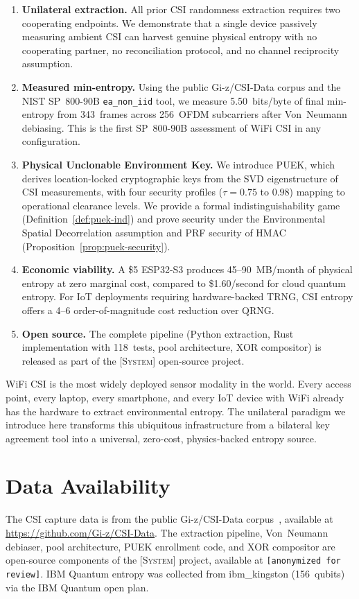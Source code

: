 \documentclass[sigconf,anonymous,review]{acmart}
\newcommand{\zipminator}{\textsc{[System]}\xspace}
\begin{document}
\begin{enumerate}
\item \textbf{Unilateral extraction.}
All prior CSI randomness extraction requires two cooperating endpoints.
We demonstrate that a single device passively measuring ambient CSI can harvest genuine physical entropy with no cooperating partner, no reconciliation protocol, and no channel reciprocity assumption.

\item \textbf{Measured min-entropy.}
Using the public Gi-z/CSI-Data corpus and the NIST SP~800-90B \texttt{ea\_non\_iid} tool, we measure 5.50~bits/byte of final min-entropy from 343~frames across 256~OFDM subcarriers after Von~Neumann debiasing.
This is the first SP~800-90B assessment of WiFi CSI in any configuration.

\item \textbf{Physical Unclonable Environment Key.}
We introduce PUEK, which derives location-locked cryptographic keys from the SVD eigenstructure of CSI measurements, with four security profiles ($\tau = 0.75$ to $0.98$) mapping to operational clearance levels.
We provide a formal indistinguishability game (Definition~\ref{def:puek-ind}) and prove security under the Environmental Spatial Decorrelation assumption and PRF security of HMAC (Proposition~\ref{prop:puek-security}).

\item \textbf{Economic viability.}
A \$5 ESP32-S3 produces 45--90~MB/month of physical entropy at zero marginal cost, compared to \$1.60/second for cloud quantum entropy.
For IoT deployments requiring hardware-backed TRNG, CSI entropy offers a 4--6 order-of-magnitude cost reduction over QRNG.

\item \textbf{Open source.}
The complete pipeline (Python extraction, Rust implementation with 118~tests, pool architecture, XOR compositor) is released as part of the \zipminator open-source project.
\end{enumerate}

WiFi CSI is the most widely deployed sensor modality in the world.
Every access point, every laptop, every smartphone, and every IoT device with WiFi already has the hardware to extract environmental entropy.
The unilateral paradigm we introduce here transforms this ubiquitous infrastructure from a bilateral key agreement tool into a universal, zero-cost, physics-backed entropy source.

\section*{Data Availability}
The CSI capture data is from the public Gi-z/CSI-Data corpus~\cite{gringoli2019csidata}, available at \url{https://github.com/Gi-z/CSI-Data}.
The extraction pipeline, Von~Neumann debiaser, pool architecture, PUEK enrollment code, and XOR compositor are open-source components of the \zipminator project, available at \texttt{[anonymized for review]}.
IBM Quantum entropy was collected from ibm\_kingston (156~qubits) via the IBM Quantum open plan.
\end{document}
